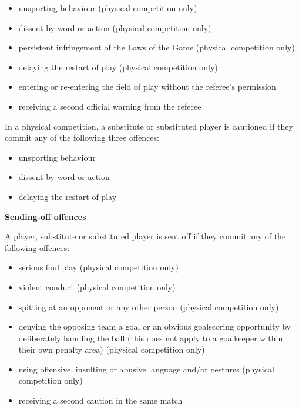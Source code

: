 \begin{itemize}
\item unsporting behaviour (physical competition only)
\item dissent by word or action (physical competition only)
\item persistent infringement of the Laws of the Game (physical competition only)
\item delaying the restart of play (physical competition only)
\item entering or re-entering the field of play without the referee's permission
\item receiving a second official warning from the referee
\end{itemize}

\bigskip

In a physical competition, a substitute or substituted player is cautioned if they commit any of the following three offences:

\begin{itemize}
\item unsporting behaviour
\item dissent by word or action
\item delaying the restart of play
\end{itemize}



{\bfseries Sending-off offences}

\headlinebox

A player, substitute or substituted player is sent off if they commit any of the following offences:

\begin{itemize}
\item serious foul play (physical competition only)
\item violent conduct (physical competition only)
\item spitting at an opponent or any other person (physical competition only)
\item denying the opposing team a goal or an obvious goalscoring opportunity by deliberately handling the ball (this does not apply to a goalkeeper within their own penalty area) (physical competition only)
\item using offensive, insulting or abusive language and/or gestures (physical competition only)
\item receiving a second caution in the same match
\end{itemize}

